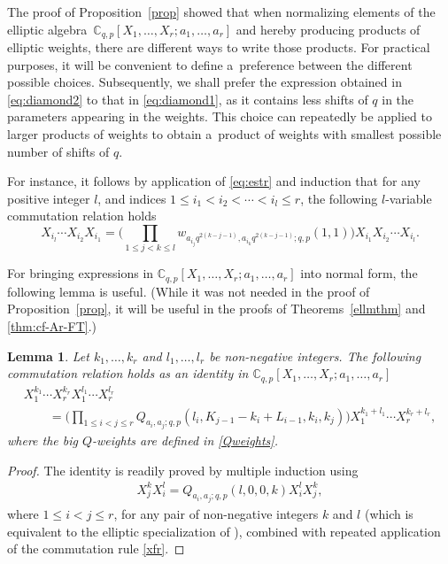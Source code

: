 \documentclass[10pt,a4paper]{amsart}
\numberwithin{equation}{section}
\newtheorem{Lemma}[Theorem]{Lemma}
\theoremstyle{definition}
\newcommand{\C}{\mathbb C}
\begin{document}
The proof of Proposition~\ref{prop} showed that
when normalizing elements of the elliptic algebra~${\C_{q,p}[X_1,\dots,X_r;a_1,\dots,a_r]}$ and hereby
producing products of elliptic weights,
there are different ways to write those products.
For practical purposes, it will be convenient to define a~preference
between the different possible choices. Subsequently, we shall
prefer the expression obtained in \eqref{eq:diamond2}
to that in \eqref{eq:diamond1},
as it contains less shifts of $q$ in the parameters appearing in the weights.
This choice can repeatedly be applied to larger products of weights to
obtain a~product of weights with smallest possible number of shifts of $q$.

For instance, it follows by application of \eqref{eq:estr} and induction
that for any positive integer $l$,
and indices $1\le i_1<i_2<\cdots<i_l\le r$,
the following $l$-variable commutation relation holds
\[%
X_{i_{l}}\cdots X_{i_2}X_{i_1}
=\bigg(\prod_{1\le j<k\le l}w_{a_{i_j}q^{2(k-j-1)},a_{i_k}q^{2(k-j-1)};q,p}(1,1)\bigg)
X_{i_1}X_{i_2}\cdots X_{i_{l}}.
\]


For bringing expressions in
$\C_{q,p}[X_1,\dots,X_r;a_1,\dots,a_r]$
into normal form, the following lemma is useful. (While it was not needed
in the proof of Proposition~\ref{prop}, it will be useful in the proofs
of Theorems~\ref{ellmthm} and \ref{thm:cf-Ar-FT}.)

\begin{Lemma}\label{lem:com}
Let $k_1,\dots,k_r$ and $l_1,\dots,l_r$ be non-negative integers.
The following commutation relation holds as an identity in
$\C_{q,p}[X_1,\dots,X_r;a_1,\dots,a_r]$
\begin{gather*}
X_1^{k_1}\cdots X_r^{k_r}X_1^{l_1}\cdots X_r^{l_r}\\
\qquad
=\bigg(\prod_{1\le i<j\le r}Q_{a_i,a_j;q,p}(l_i,K_{j-1}-k_i+L_{i-1},k_i,k_j)\bigg)
X_1^{k_1+l_1}\cdots X_r^{k_r+l_r},
\end{gather*}
where the big $Q$-weights are defined in \eqref{Qweights}.
\end{Lemma}
\begin{proof}
The identity is readily proved by multiple induction using
\begin{gather*}%
X_j^{k}X_i^{l}=Q_{a_i,a_j;q,p}(l,0,0,k) X_i^{l}X_j^k,
\end{gather*}
where $1\le i<j\le r$, for any pair of non-negative integers $k$ and $l$
(which is equivalent to the elliptic specialization of \cite[Lemma~1]{S1}),
combined with repeated application of the commutation rule \eqref{xfr}.
\end{proof}
\end{document}
